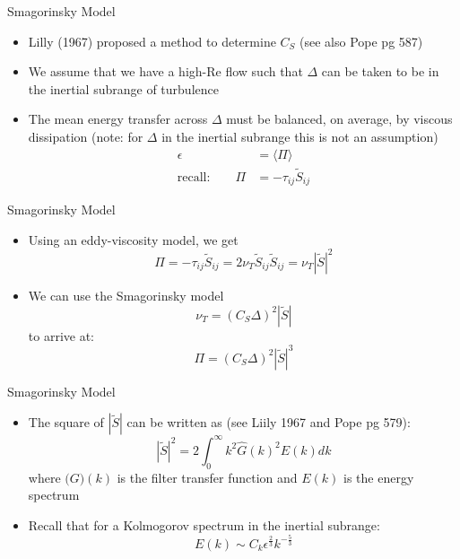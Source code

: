 \begin{frame}{Smagorinsky Model}

\begin{itemize}
	\item Lilly (1967) proposed a method to determine $C_S$ (see also Pope pg 587)
	\item We assume that we have a high-Re flow such that $\Delta$ can be taken to be in the inertial subrange of turbulence
	\item The mean energy transfer across $\Delta$ must be balanced, on average,  by viscous dissipation (note: for $\Delta$ in the inertial subrange this is not an assumption)
	\begin{align*}
		\epsilon &= \langle \Pi \rangle\\
		\text{recall:}\qquad \Pi &= -\tau_{ij} \widetilde{S}_{ij}
	\end{align*}
	
\end{itemize}

\end{frame}

\begin{frame}{Smagorinsky Model}

\begin{itemize}
	\item Using an eddy-viscosity model, we get
	$$\Pi = -\tau_{ij} \widetilde{S}_{ij} = 2\nu_T \widetilde{S}_{ij}\widetilde{S}_{ij} = \nu_T |\widetilde{S}|^2$$
	\item We can use the Smagorinsky model
	$$\nu_T = (C_S \Delta)^2 | \widetilde{S}|$$
	to arrive at:
	$$\Pi = (C_S \Delta)^2 | \widetilde{S}|^3$$
\end{itemize}

\end{frame}

\begin{frame}{Smagorinsky Model}

\begin{itemize}
	\item The square of $|\widetilde{S}|$ can be written as (see Liily 1967 and Pope pg 579):
	$$|\widetilde{S}|^2 = 2\int^{\infty}_{0} k^2 \hat G(k)^2 E(k) dk$$
	where $\hat(G)(k)$ is the filter transfer function and $E(k)$ is the energy spectrum
	\item Recall that for a Kolmogorov spectrum in the inertial subrange:
	$$E(k) \sim C_k \epsilon^\frac{2}{3}k^{-\frac{5}{3}}$$
\end{itemize}

\end{frame}

